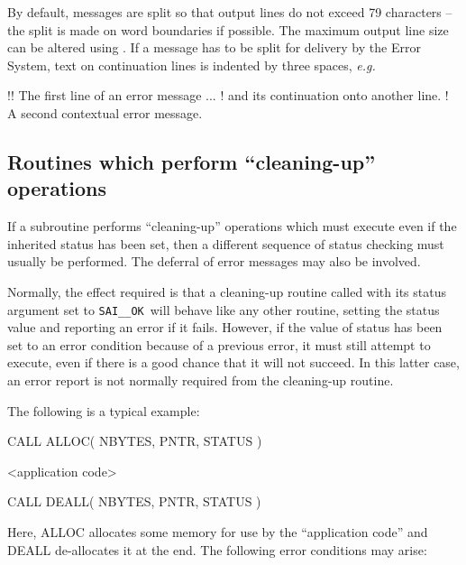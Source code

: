 \documentclass[twoside,11pt]{starlink}
\providecommand{\const}[1]{\texttt{#1}}
\providecommand{\saiok}{\const{SAI\_\_OK}}
\begin{document}
By default, messages are split so that output lines do not exceed
79 characters -- the split is made on word boundaries if possible.
The maximum output line size can be altered using
.
If a message has to be split for delivery by the Error System, text on
continuation lines is indented by three spaces, \textit{e.g.}
\begin {small}
\begin{terminalv}
!! The first line of an error message ...
!     and its continuation onto another line.
!  A second contextual error message.
\end{terminalv}
\end {small}

\subsection{Routines which perform ``cleaning-up'' operations}

If a subroutine performs ``cleaning-up'' operations which must execute even
if the inherited status has been set, then a different sequence of status
checking must usually be performed.
The deferral of error messages may also be involved.

Normally, the effect required is that a cleaning-up routine called with
its status argument set to \saiok\ will behave like any other routine,
setting the status value and reporting an error if it fails.
However, if the value of status has been set to an error condition because of
a previous error, it must still attempt to execute, even if there is a
good chance that it will not succeed.
In this latter case, an error report is not normally required from the
cleaning-up routine.

The following is a typical example:

\begin {small}
\begin{terminalv}
      CALL ALLOC( NBYTES, PNTR, STATUS )

      <application code>

      CALL DEALL( NBYTES, PNTR, STATUS )
\end{terminalv}
\end {small}

Here, ALLOC allocates some memory for use by the ``application code'' and
DEALL de-allocates it at the end.
The following error conditions may arise:
\end{document}
